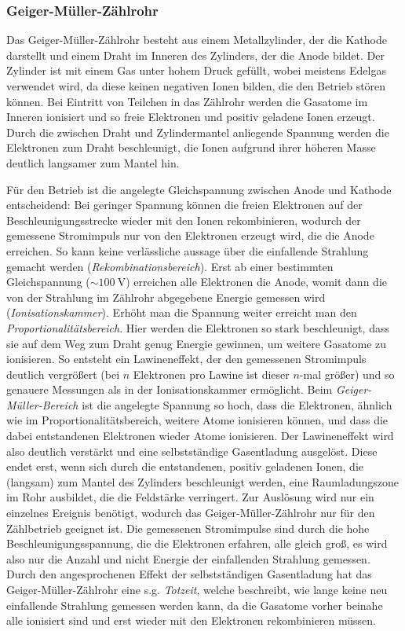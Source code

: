 \documentclass[11pt, a4paper]{article}
\begin{document}
\subsubsection{Geiger-Müller-Zählrohr}
Das Geiger-Müller-Zählrohr besteht aus einem Metallzylinder, der die Kathode darstellt und einem Draht im Inneren des Zylinders, der die Anode bildet.
Der Zylinder ist mit einem Gas unter hohem Druck gefüllt, wobei meistens Edelgas verwendet wird, da diese keinen negativen Ionen bilden, die den Betrieb stören können.
Bei Eintritt von Teilchen in das Zählrohr werden die Gasatome im Inneren ionisiert und so freie Elektronen und positiv geladene Ionen erzeugt.
Durch die zwischen Draht und Zylindermantel anliegende Spannung werden die Elektronen zum Draht beschleunigt, die Ionen aufgrund ihrer höheren Masse deutlich langsamer zum Mantel hin.

Für den Betrieb ist die angelegte Gleichspannung zwischen Anode und Kathode entscheidend:
Bei geringer Spannung können die freien Elektronen auf der Beschleunigungsstrecke wieder mit den Ionen rekombinieren, wodurch der gemessene Stromimpuls nur von den Elektronen erzeugt wird, die die Anode erreichen.
So kann keine verlässliche aussage über die einfallende Strahlung gemacht werden (\emph{Rekombinationsbereich}).
Erst ab einer bestimmten Gleichspannung ($\sim \SI{100}{\volt}$) erreichen alle Elektronen die Anode, womit dann die von der Strahlung im Zählrohr abgegebene Energie gemessen wird (\emph{Ionisationskammer}).
Erhöht man die Spannung weiter erreicht man den \emph{Proportionalitätsbereich}.
Hier werden die Elektronen so stark beschleunigt, dass sie auf dem Weg zum Draht genug Energie gewinnen, um weitere Gasatome zu ionisieren.
So entsteht ein Lawineneffekt, der den gemessenen Stromimpuls deutlich vergrößert (bei $n$ Elektronen pro Lawine ist dieser $n$-mal größer) und so genauere Messungen als in der Ionisationskammer ermöglicht.
Beim \emph{Geiger-Müller-Bereich} ist die angelegte Spannung so hoch, dass die Elektronen, ähnlich wie im Proportionalitätsbereich, weitere Atome ionisieren können, und dass die dabei entstandenen Elektronen wieder Atome ionisieren.
Der Lawineneffekt wird also deutlich verstärkt und eine selbstständige Gasentladung ausgelöst.
Diese endet erst, wenn sich durch die entstandenen, positiv geladenen Ionen, die (langsam) zum Mantel des Zylinders beschleunigt werden, eine Raumladungszone im Rohr ausbildet, die die Feldstärke verringert.
Zur Auslösung wird nur ein einzelnes Ereignis benötigt, wodurch das Geiger-Müller-Zählrohr nur für den Zählbetrieb geeignet ist.
Die gemessenen Stromimpulse sind durch die hohe Beschleunigungsspannung, die die Elektronen erfahren, alle gleich groß, es wird also nur die Anzahl und nicht Energie der einfallenden Strahlung gemessen.
Durch den angesprochenen Effekt der selbstständigen Gasentladung hat das Geiger-Müller-Zählrohr eine s.g. \emph{Totzeit}, welche beschreibt, wie lange keine neu einfallende Strahlung gemessen werden kann, da die Gasatome vorher beinahe alle ionisiert sind und erst wieder mit den Elektronen rekombinieren müssen.
\end{document}
